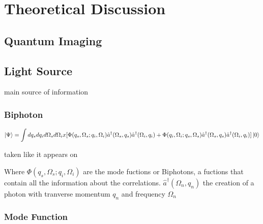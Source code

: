
\chapter{Theoretical Discussion} %

\label{Chapter2} %


\section{Quantum Imaging}



\section{Light Source}

main source of information \cite{physicsGhost}
\subsection{Biphoton}

\begin{equation}
\ket{\Psi}=\int dq_s dq_i d\Omega_s d\Omega_i 
x [\Phi(q_s,\Omega_s;q_i,\Omega_i) \hat{a}^{\dagger} (\Omega_s,q_s) \hat{a}^{\dagger}(\Omega_i,q_i) \\
+ \Phi(q_i,\Omega_i;q_s,\Omega_s) \hat{a}^{\dagger}(\Omega_s,q_s) \hat{a}^{\dagger}(\Omega_i,q_i)]   \ket{0}  
\end{equation}

taken like it appears on \cite{spatiocorrelations}

 Where $\Phi(q_s,\Omega_s;q_i,\Omega_i)$ are the mode fuctions or Biphotons, a fuctions that contain all the information about the correlations. $ \hat{a}^{\dagger}(\Omega_n,q_n)$ the creation of a photon with tranverse momentum $q_n$ and frequency $\Omega_n$


\subsection{Mode Function}


